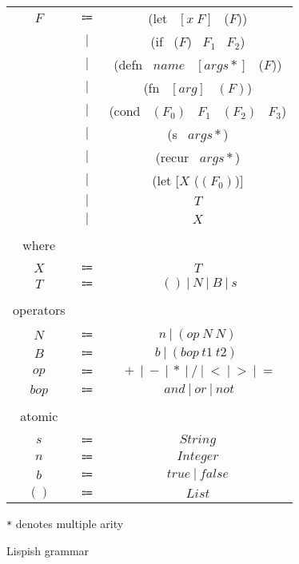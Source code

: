 \begin{figure}[ht]
\centering
\begin{tabular}{ c c c }
$F$ & $\Coloneqq$ & (let \ $[x \ F]$ \ ($F$)) \\
 & $|$ & (if \ ($F$) \ $F_1$ \ $F_2$) \\
 & $|$ & (defn \ $name$ \ $[args*]$ \ ($F$)) \\
 & $|$ & (fn \ $[arg]$ \ $(F)$) \\
 & $|$ & (cond \ $(F_0)$ \ $F_1$ \ $(F_2)$ \ $F_3$) \\
 & $|$ & (s \ $args*$) \\
 & $|$ & (recur \ $args*$) \\
 & $|$ & (let [$X$ ($(F_0)$)]  \\
 & $|$ & $T$ \\
 & $|$ & $X$ \\
 & & \\
where & & \\
 & & \\
$X$ & $\Coloneqq$ & $T$ \\
$T$ & $\Coloneqq$ & $ \ () \ \vert \ N \ \vert \ B \ \vert \ s $ \\
& & \\
operators & & \\
 & & \\
$N$ & $\Coloneqq$ & $ n \ \vert \ (op \ N \ N) $ \\
$B$ & $\Coloneqq$ & $ b \ \vert \ (bop \ t1 \ t2) \ $ \\
$op$ & $\Coloneqq$ & $ \ + \ \vert \ - \ \vert \ * \ \vert \ / \ \vert \ < \ \vert \ > \ \vert \ =$\\
$bop$ & $\Coloneqq$ & $ \ and \ \vert \ or \ \vert \ not$ \\
& & \\
atomic & & \\
 & & \\
$s$ & $\Coloneqq$ & $ String $ \\
$n$ & $\Coloneqq$ & $ Integer $ \\
$b$ & $\Coloneqq$ & $ true \ \vert \ false $ \\
$()$ & $\Coloneqq$ & $ List $ \\
\end{tabular}
\texttt{*} denotes multiple arity 

\caption{Lispish grammar}
\label{fig:lispish-grammar}
\end{figure}